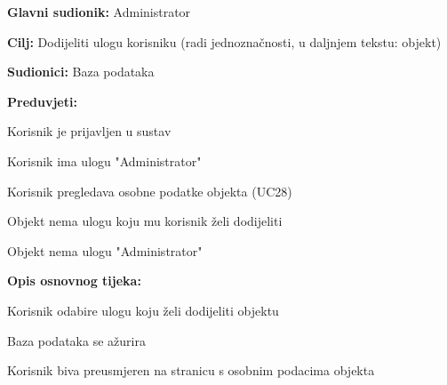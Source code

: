					\noindent {}
					\begin{packed_item}
	
						\item \textbf{Glavni sudionik: }Administrator
						\item  \textbf{Cilj:} Dodijeliti ulogu korisniku (radi jednoznačnosti, u daljnjem tekstu: objekt)
						\item  \textbf{Sudionici:} Baza podataka
						\item  \textbf{Preduvjeti:}
						\item[] \begin{packed_enum}
							\item Korisnik je prijavljen u sustav
							\item Korisnik ima ulogu "Administrator"
							\item Korisnik pregledava osobne podatke objekta (UC28)
							\item Objekt nema ulogu koju mu korisnik želi dodijeliti
							\item Objekt nema ulogu "Administrator"
						\end{packed_enum}
						\item  \textbf{Opis osnovnog tijeka:}
						
						\item[] \begin{packed_enum}
	
							\item Korisnik odabire ulogu koju želi dodijeliti objektu
							\item Baza podataka se ažurira
							\item Korisnik biva preusmjeren na stranicu s osobnim podacima objekta
						\end{packed_enum}
						
					\end{packed_item}
					
